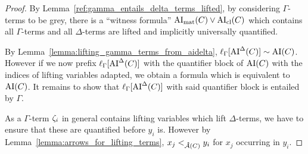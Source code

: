 \documentclass[,%
	paper=a4,%
	DIV14, %
	twoside=false,%
	liststotoc,
	bibtotoc,
	draft=false,%
	numbers=noendperiod
]{scrartcl}
\begin{document}
\begin{proof}
\begin{comment}
				$\Gamma \entails Q_1' z_1' \dots Q_{m'}' z_{m'}' \Big( \AImatrix(C_2) \lor \clauseTwoPrime \lor {\lnot (l{\fromclause'})_\Gamma} \Big)$
				\bigskip


				By the previous proof:

				$\Gamma \stackrel{\markA}\entails Q_1 z_1 \dots Q_m z_m \Big(\lifboth{\AImatrix(C_1)\sigma}\tau \lor \lifboth{\clauseOnePrime\sigma}\tau \lor \lifboth{(l{\fromclause})_\Gamma\sigma}\tau \Big)$

				$\Gamma \stackrel{\markB}\entails Q_1' z_1' \dots Q_{m'}' z_{m'}' \Big(  \lifboth{\AImatrix(C_2)\sigma}\tau \lor \lifboth{\clauseTwoPrime\sigma}\tau \lor \lnot \lifboth{(l{\fromclause'})_\Gamma\sigma}\tau \Big)$

		\end{description}
	\end{comment}

	By Lemma~\ref{ref:gamma_entails_delta_terms_lifted}, by considering $\Gamma$-terms to be grey, there is a ``witness formula'' 
	$\operatorname{AI}_\mathrm{mat}(C) \lor \operatorname{AI}_\mathrm{cl}(C)$ which contains all $\Gamma$-terms and all $\Delta$-terms are lifted and implicitly universally quantified.

	By Lemma~\ref{lemma:lifting_gamma_terms_from_aidelta},
	$\ell_{\Gamma}[\operatorname{AI}^\Delta(C)] \sim \operatorname{AI}(C)$.
	However if we now prefix $\ell_{\Gamma}[\operatorname{AI}^\Delta(C)]$ with the quantifier block of $\operatorname{AI}(C)$ with the indices of lifting variables adapted, we obtain a formula which is equivalent to $\operatorname{AI}(C)$.
	It remains to show that $\ell_{\Gamma}[\operatorname{AI}^\Delta(C)]$ with said quantifier block is entailed by $\Gamma$.

	As a $\Gamma$-term $\zeta_{i}$ in general contains lifting variables which lift $\Delta$-terms, we have to ensure that these are quantified before $y_i$ is.
	However by Lemma~\ref{lemma:arrows_for_lifting_terms}, $x_j <_{\operatorname{{\mathcal{\bm{\hat}A}}}(C)} y_i$ for $x_j$ occurring in $y_i$.



\end{proof}
\end{document}
